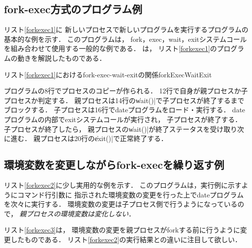 \subsection{fork-exec方式のプログラム例}
リスト\ref{forkexec1}に
新しいプロセスで新しいプログラムを実行するプログラムの基本的な例を示す．
このプログラムは，
fork，exec，wait，exitシステムコールを組み合わせて使用する一般的な例である．
は，
リスト\ref{forkexec1}のプログラムの動きを解説したものである．

  
  
    {リスト\ref{forkexec1}におけるfork-exec-wait-exitの関係}{forkExecWaitExit}

プログラムの8行でプロセスのコピーが作られる．
12行で自身が親プロセスか子プロセスか判定する．
親プロセスは14行の\|wait()|で子プロセスが終了するまでブロックする．
子プロセスは16行でdateプログラムをロード・実行する．
dateプログラムの内部でexitシステムコールが実行され，
子プロセスが終了する．
子プロセスが終了したら，
親プロセスの\|wait()|が終了ステータスを受け取り次に進む．
親プロセスは20行の\|exit()|で正常終了する．

\subsection{環境変数を変更しながらfork-execを繰り返す例}
リスト\ref{forkexec2}に少し実用的な例を示す．
このプログラムは，実行例に示すようにコマンド行引数に
指示された環境変数の変更を行った上でdateプログラムを次々に実行する．
環境変数の変更は子プロセス側で行うようになっているので，
\emph{親プロセスの環境変数は変化しない}．



リスト\ref{forkexec3}は，
環境変数の変更を親プロセスがforkする前に行うように変更したものである．
リスト\ref{forkexec2}の実行結果との違いに注目して欲しい．



